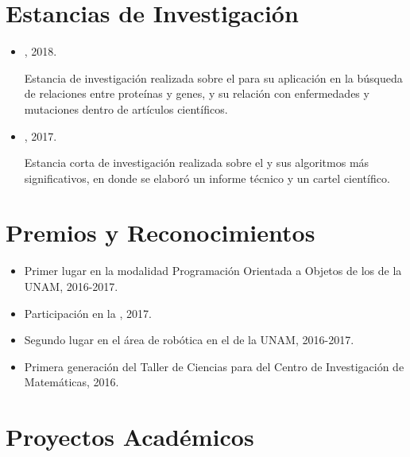 \documentclass{curriculum-vitae}
\begin{document}
  \section{Estancias de Investigación}
    \begin{itemize}
      \item
        , 2018.
        
        Estancia de investigación realizada sobre el  para su aplicación en la búsqueda de
        relaciones entre proteínas y genes, y su relación con enfermedades y
        mutaciones dentro de artículos científicos.

      \item 
        , 2017.
        
        Estancia corta de investigación realizada sobre el  y sus algoritmos más significativos, en donde se elaboró un
        informe técnico y un cartel científico.

    \end{itemize}

  \section{Premios y Reconocimientos}

    \begin{itemize}
      \item
        Primer lugar en la modalidad Programación Orientada a Objetos de los
         de la UNAM, 2016-2017.

      \item
        Participación en la ,
        2017.

      \item
        Segundo lugar en el área de robótica en el  de la UNAM, 2016-2017.

      \item
        Primera generación del Taller de Ciencias para 
        del Centro de Investigación de Matemáticas, 2016.
    \end{itemize}

  \section{Proyectos Académicos}
\end{document}
